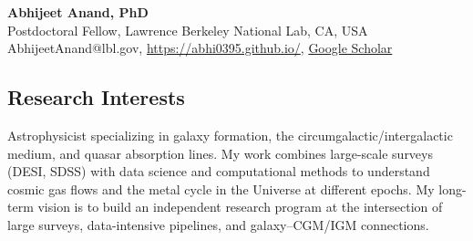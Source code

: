 \documentclass[12pt,letterpaper]{article}
\begin{document}
\thispagestyle{empty}\sloppy\sloppypar\raggedbottom

\textbf{\Large Abhijeet Anand, PhD}\\[0.5ex]
Postdoctoral Fellow, Lawrence Berkeley National Lab, CA, USA\\[0.5ex]
\textsf{\small AbhijeetAnand@lbl.gov, \href{https://abhi0395.github.io/}{https://abhi0395.github.io/}, \href{https://scholar.google.com/citations?hl=en&user=MfOuq1IAAAAJ}{Google Scholar}}\\[0.5ex]

\subsection{Research Interests}

Astrophysicist specializing in galaxy formation, the circumgalactic/intergalactic medium, and quasar absorption lines. My work combines large-scale surveys (DESI, SDSS) with data science and computational methods to understand cosmic gas flows and the metal cycle in the Universe at different epochs. My long-term vision is to build an independent research program at the intersection of large surveys, data-intensive pipelines, and galaxy–CGM/IGM connections.

\vspace{-1.5mm}
\end{document}
